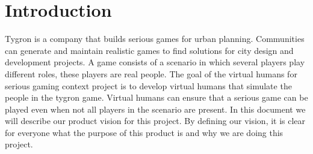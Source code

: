 \section{Introduction}
Tygron is a company that builds serious games for urban planning. Communities can generate and maintain realistic games to find solutions for city design and development projects. A game consists of a scenario in which several players play different roles, these players are real people. The goal of the virtual humans for serious gaming context project is to develop virtual humans that simulate the people in the tygron game. Virtual humans can ensure that a serious game can be played even when not all players in the scenario are present. 
In this document we will describe our product vision for this project. By defining our vision, it is clear for everyone what the purpose of this product is and why we are doing this project. 